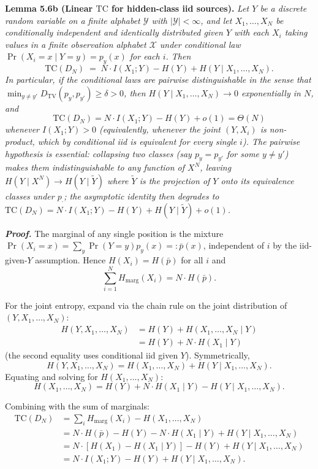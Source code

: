 \documentclass[
]{article}
\begin{document}
\textbf{Lemma 5.6b (Linear $\mathrm{TC}$ for hidden-class iid
sources).} \emph{Let $Y$ be a discrete random variable on a finite
alphabet $\mathcal{Y}$ with $|\mathcal{Y}| < \infty$, and let
$X_1, \ldots, X_N$ be conditionally independent and identically
distributed given $Y$ with each $X_i$ taking values in a finite
observation alphabet $\mathcal{X}$ under conditional law
$\Pr(X_i = x \mid Y = y) = p_y(x)$ for each $i$. Then}
\[
\mathrm{TC}(D_N) \;=\; N \cdot I(X_1; Y) - H(Y) + H(Y \mid X_1, \ldots, X_N).
\tag{5.6}
\]
\emph{In particular, if the conditional laws are pairwise
distinguishable in the sense that
$\min_{y \neq y'} D_{\mathrm{TV}}(p_y, p_{y'}) \geq \delta > 0$, then
$H(Y \mid X_1, \ldots, X_N) \to 0$ exponentially in $N$, and}
\[
\mathrm{TC}(D_N) = N \cdot I(X_1; Y) - H(Y) + o(1) = \Theta(N)
\]
\emph{whenever $I(X_1; Y) > 0$ (equivalently, whenever the joint
$(Y, X_i)$ is non-product, which by conditional iid is equivalent
for every single $i$). The pairwise hypothesis is essential:
collapsing two classes (say $p_y = p_{y'}$ for some $y \neq y'$)
makes them indistinguishable to any function of $X^N$, leaving
$H(Y \mid X^N) \to H(Y \mid \tilde Y)$ where $\tilde Y$ is the
projection of $Y$ onto its equivalence classes under $p_\cdot$;
the asymptotic identity then degrades to
$\mathrm{TC}(D_N) = N \cdot I(X_1; Y) - H(Y) + H(Y \mid \tilde Y) + o(1)$.}

\emph{\textbf{Proof.}} The marginal of any single position is the
mixture
$\Pr(X_i = x) = \sum_y \Pr(Y = y) p_y(x) =: \bar p(x)$,
independent of $i$ by the iid-given-$Y$ assumption. Hence
$H(X_i) = H(\bar p)$ for all $i$ and
\[
\sum_{i=1}^N H_{\mathrm{marg}}(X_i) = N \cdot H(\bar p).
\]

For the joint entropy, expand via the chain rule on the joint
distribution of $(Y, X_1, \ldots, X_N)$:
\[
\begin{aligned}
H(Y, X_1, \ldots, X_N)
&= H(Y) + H(X_1, \ldots, X_N \mid Y) \\
&= H(Y) + N \cdot H(X_1 \mid Y)
\end{aligned}
\]
(the second equality uses conditional iid given $Y$). Symmetrically,
\[
H(Y, X_1, \ldots, X_N) = H(X_1, \ldots, X_N) + H(Y \mid X_1, \ldots, X_N).
\]
Equating and solving for $H(X_1, \ldots, X_N)$:
\[
H(X_1, \ldots, X_N) = H(Y) + N \cdot H(X_1 \mid Y) - H(Y \mid X_1, \ldots, X_N).
\]

Combining with the sum of marginals:
\[
\begin{aligned}
\mathrm{TC}(D_N) &= \sum_i H_{\mathrm{marg}}(X_i) - H(X_1, \ldots, X_N) \\
&= N \cdot H(\bar p) - H(Y) - N \cdot H(X_1 \mid Y) + H(Y \mid X_1, \ldots, X_N) \\
&= N \cdot [H(X_1) - H(X_1 \mid Y)] - H(Y) + H(Y \mid X_1, \ldots, X_N) \\
&= N \cdot I(X_1; Y) - H(Y) + H(Y \mid X_1, \ldots, X_N).
\end{aligned}
\]
\end{document}

